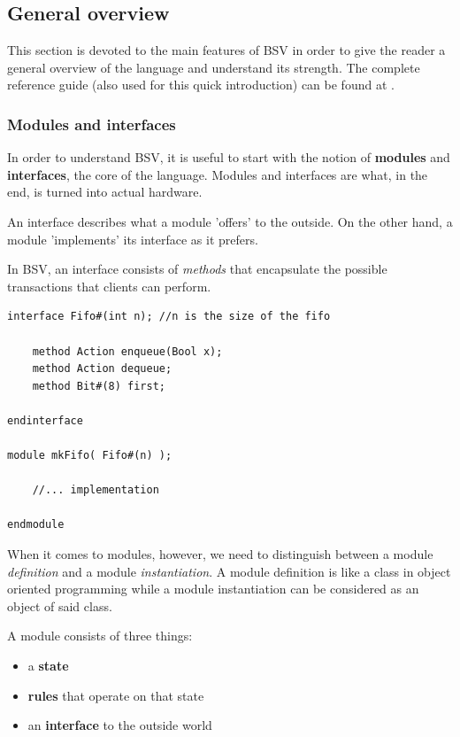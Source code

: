 \documentclass[12pt,oneside,a4paper]{article}
\begin{document}
\subsection{General overview}

This section is devoted to the main features of BSV in order to give the reader a general overview of the language and understand its strength. The complete reference guide (also used for this quick introduction) can be found at \cite{bsv_guide}.
\subsubsection{Modules and interfaces}
In order to understand BSV, it is useful to start with the notion of \textbf{modules} and \textbf{interfaces}, the core of the language. Modules and interfaces are what, in the end, is turned into actual hardware. 

An interface describes what a module 'offers' to the outside. On the other hand, a module 'implements' its interface as it prefers.

In BSV, an interface consists of \textit{methods} that encapsulate the possible transactions that clients can perform. 

\begin{lstlisting}[label={list:moduleinterface},caption={Example of module and interface}]
interface Fifo#(int n);	//n is the size of the fifo

	method Action enqueue(Bool x);
	method Action dequeue;
	method Bit#(8) first;
	
endinterface

module mkFifo( Fifo#(n) );

	//... implementation
	
endmodule
\end{lstlisting}

When it comes to modules, however, we need to distinguish between a module \textit{definition} and a module \textit{instantiation}. A module definition is like a class in object oriented programming while a module instantiation can be considered as an object of said class.

A module consists of three things: 
\begin{itemize}
	\item a \textbf{state}
	\item  \textbf{rules} that operate on that state
	\item an \textbf{interface} to the outside world
\end{itemize}
\end{document}

